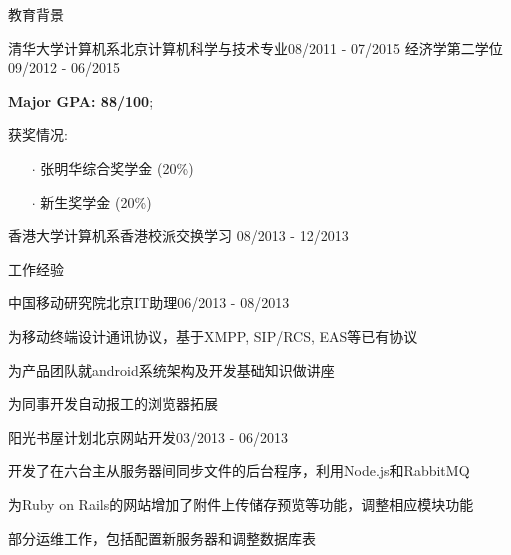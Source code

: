 \documentclass{resume} %
\begin{document}
\vspace{-1.5em}
\begin{rSection}{教育背景}
\begin{eSubsection}{清华大学计算机系}{北京}{计算机科学与技术专业}{08/2011 - 07/2015}
{经济学第二学位}{09/2012 - 06/2015}
\item \textbf{Major GPA: 88/100};
\item 获奖情况:
\begin{itemize}
\itemsep -0.5em \vspace{-0.5em}
\item[$\cdot$] 张明华综合奖学金 (20\%)
\item[$\cdot$] 新生奖学金 (20\%)
\end{itemize}
\end{eSubsection}
\vspace{-0.8em}
\begin{eSubsection}{香港大学计算机系}{香港}{校派交换学习}{ 08/2013 - 12/2013}
\end{eSubsection}
\end{rSection}
\vspace{-1.0em}

\begin{rSection}{工作经验}
\begin{rSubsection}{中国移动研究院}{北京}{IT助理}{06/2013 - 08/2013}
\vspace{-0.4em}
\item 为移动终端设计通讯协议，基于XMPP, SIP/RCS, EAS等已有协议
\item 为产品团队就android系统架构及开发基础知识做讲座
\item 为同事开发自动报工的浏览器拓展
\end{rSubsection}
\vspace{-0.8em}
\begin{rSubsection}{阳光书屋计划}{北京}{网站开发}{03/2013 - 06/2013}
\vspace{-0.4em}
\item 开发了在六台主从服务器间同步文件的后台程序，利用Node.js和RabbitMQ
\item 为Ruby on Rails的网站增加了附件上传储存预览等功能，调整相应模块功能
\item 部分运维工作，包括配置新服务器和调整数据库表
\end{rSubsection}
\end{rSection}
\vspace{-1.0em}
\end{document}
